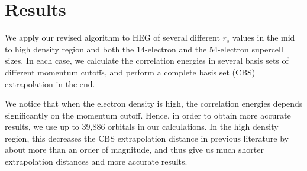 \section{Results}
\label{results}
We apply our revised algorithm to HEG of several different $r_s$ values in the mid to high density region and both the 14-electron and the 54-electron supercell sizes.
In each case, we calculate the correlation energies in several basis sets of different momentum cutoffs, and perform a complete basis set (CBS) extrapolation in the end.

We notice that when the electron density is high, the correlation energies depends significantly on the momentum cutoff.
Hence, in order to obtain more accurate results, we use up to 39,886 orbitals in our calculations.
In the high density region, this decreases the CBS extrapolation distance in previous literature by about more than an order of magnitude, and thus give us much shorter extrapolation distances and more accurate results.

